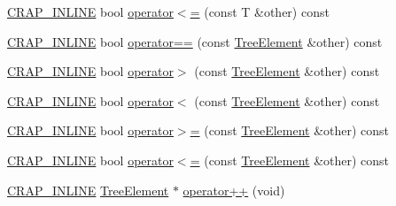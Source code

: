 \begin{DoxyCompactItemize}
\item 
\hyperlink{compilers_8h_a5a40526b8d842e7ff731509998bb0f1c}{C\-R\-A\-P\-\_\-\-I\-N\-L\-I\-N\-E} bool \hyperlink{structcrap_1_1container_1_1_tree_element_a3f627826a89b72a1fb7229bf83a59e87}{operator$<$=} (const T \&other) const 
\item 
\hyperlink{compilers_8h_a5a40526b8d842e7ff731509998bb0f1c}{C\-R\-A\-P\-\_\-\-I\-N\-L\-I\-N\-E} bool \hyperlink{structcrap_1_1container_1_1_tree_element_a9b14b908159e1c8c89ca8f7f77a49fed}{operator==} (const \hyperlink{structcrap_1_1container_1_1_tree_element}{Tree\-Element} \&other) const 
\item 
\hyperlink{compilers_8h_a5a40526b8d842e7ff731509998bb0f1c}{C\-R\-A\-P\-\_\-\-I\-N\-L\-I\-N\-E} bool \hyperlink{structcrap_1_1container_1_1_tree_element_afbe51792d56f13870246e797109d758a}{operator$>$} (const \hyperlink{structcrap_1_1container_1_1_tree_element}{Tree\-Element} \&other) const 
\item 
\hyperlink{compilers_8h_a5a40526b8d842e7ff731509998bb0f1c}{C\-R\-A\-P\-\_\-\-I\-N\-L\-I\-N\-E} bool \hyperlink{structcrap_1_1container_1_1_tree_element_a8ba00871c85caabec097a0415af8f2a3}{operator$<$} (const \hyperlink{structcrap_1_1container_1_1_tree_element}{Tree\-Element} \&other) const 
\item 
\hyperlink{compilers_8h_a5a40526b8d842e7ff731509998bb0f1c}{C\-R\-A\-P\-\_\-\-I\-N\-L\-I\-N\-E} bool \hyperlink{structcrap_1_1container_1_1_tree_element_a3e168f60f9bf5c0cbf69360420af6c66}{operator$>$=} (const \hyperlink{structcrap_1_1container_1_1_tree_element}{Tree\-Element} \&other) const 
\item 
\hyperlink{compilers_8h_a5a40526b8d842e7ff731509998bb0f1c}{C\-R\-A\-P\-\_\-\-I\-N\-L\-I\-N\-E} bool \hyperlink{structcrap_1_1container_1_1_tree_element_a845f87074417887b56d4ed1a00db26db}{operator$<$=} (const \hyperlink{structcrap_1_1container_1_1_tree_element}{Tree\-Element} \&other) const 
\item 
\hyperlink{compilers_8h_a5a40526b8d842e7ff731509998bb0f1c}{C\-R\-A\-P\-\_\-\-I\-N\-L\-I\-N\-E} \hyperlink{structcrap_1_1container_1_1_tree_element}{Tree\-Element} $\ast$ \hyperlink{structcrap_1_1container_1_1_tree_element_a89bfad53cfac5f7fd80c8c5b85054635}{operator++} (void)
\end{DoxyCompactItemize}
